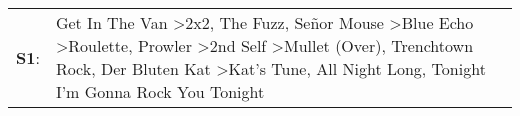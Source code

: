 \begin{supertabular}{p{0.03\textwidth}p{0.92\textwidth}}
 \textbf{S1}:  &  Get In The Van\textsuperscript{} \textgreater \enspace 2x2\textsuperscript{}, \enspace The Fuzz\textsuperscript{}, \enspace Señor Mouse\textsuperscript{} \textgreater \enspace Blue Echo\textsuperscript{} \textgreater \enspace Roulette\textsuperscript{}, \enspace Prowler\textsuperscript{} \textgreater \enspace 2nd Self\textsuperscript{} \textgreater \enspace Mullet (Over)\textsuperscript{}, \enspace Trenchtown Rock\textsuperscript{}, \enspace Der Bluten Kat\textsuperscript{} \textgreater \enspace Kat's Tune\textsuperscript{}, \enspace All Night Long\textsuperscript{}, \enspace Tonight I'm Gonna Rock You Tonight\textsuperscript{}  \enspace  \\
\end{supertabular}

